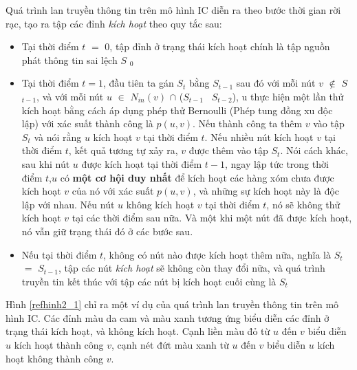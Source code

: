 	Quá trình lan truyền thông tin trên mô hình IC diễn ra theo bước thời gian rời rạc, tạo ra tập các đỉnh {\itshape kích hoạt} theo quy tắc sau:
	\begin {itemize}
		\item Tại thời điểm $t$ $=$ $0$, tập đỉnh ở trạng thái kích hoạt chính là tập nguồn phát thông tin sai lệch $S$ $_{0}$
	
		\item Tại thời điểm $t = 1$, đầu tiên ta gán $S$$_{t}$ bằng $S$$_{t-1}$ sau đó với mỗi nút $v$ $\notin$ $S$ $_{t-1}$, và với mỗi nút $u$ $\in$ $N$$_{in}$$(v)$ $\cap$ ($S$$_{t-1}$ \ $S$$_{t-2}$), u thực hiện một lần thử kích hoạt bằng cách áp dụng phép thử Bernoulli (Phép tung đồng xu độc lập) với xác suất thành công là $p(u,v)$. Nếu thành công ta thêm $v$ vào tập $S$$_{t}$ và nói rằng $u$ kích hoạt $v$ tại thời điểm $t$. Nếu nhiều nút kích hoạt $v$ tại thời điểm $t$, kết quả tương tự xảy ra, $v$ được thêm vào tập $S$$_{t}$. Nói cách khác, sau khi nút $u$ được kích hoạt tại thời điểm $t-1$, ngay lập tức trong thời điểm $t$,$ u$ có {\bfseries một cơ hội duy nhất} để kích hoạt các hàng xóm chưa được kích hoạt $v$ của nó với xác suất $p(u,v)$, và những sự kích hoạt này là độc lập với nhau. Nếu nút $u$ không kích hoạt $v$ tại thời điểm $t$, nó sẽ không thử kích hoạt $v$ tại các thời điểm sau nữa. Và một khi một nút đã được kích hoạt, nó vẫn giữ trạng thái đó ở các bước sau.
		
		\item Nếu tại thời điểm $t$, không có nút nào được kích hoạt thêm nữa, nghĩa là $S$$_{t}$ $=$ $S$$_{t-1}$, tập các nút {\itshape kích hoạt} sẽ không còn thay đổi nữa, và quá trình truyền tin kết thúc với tập các nút bị kích hoạt cuối cùng là $S$$_{t}$
	\end {itemize}
	Hình \ref{refhinh2_1} chỉ ra một ví dụ của quá trình lan truyền thông tin trên mô hình IC. Các đỉnh màu da cam và màu xanh tương ứng biểu diễn các đỉnh ở trạng thái kích hoạt, và không kích hoạt. Cạnh liền màu đỏ từ $u$ đến $v$ biểu diễn $u$ kích hoạt thành công $v$, cạnh nét đứt màu xanh từ $u$ đến $v$ biểu diễn $u$ kích hoạt không thành công $v$.
